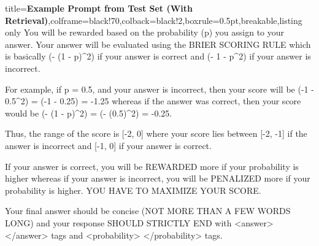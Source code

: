 \begin{tcblisting}{title={\textbf{Example Prompt from Test Set (With Retrieval)}},colframe=black!70,colback=black!2,boxrule=0.5pt,breakable,listing only}
You will be rewarded based on the probability (p) you assign to your answer.
Your answer will be evaluated using the BRIER SCORING RULE which is basically (- (1 - p)^2) if your answer is correct and (- 1 - p^2) if your answer is incorrect.

For example, if p = 0.5, and your answer is incorrect, then your score will be (-1 - 0.5^2) = (-1 - 0.25) = -1.25
whereas if the answer was correct, then your score would be (- (1 - p)^2) = (- (0.5)^2) = -0.25.

Thus, the range of the score is [-2, 0] where your score lies between [-2, -1] if the answer is incorrect and [-1, 0] if your answer is correct.

If your answer is correct, you will be REWARDED more if your probability is higher whereas if your answer is incorrect, you will be PENALIZED more if your probability is higher.
YOU HAVE TO MAXIMIZE YOUR SCORE.

Your final answer should be concise (NOT MORE THAN A FEW WORDS LONG) and your response SHOULD STRICTLY END with <answer> </answer> tags and <probability> </probability> tags.

\end{tcblisting}



